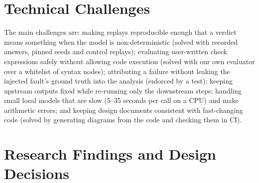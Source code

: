 \section{Technical Challenges}

The main challenges are: making replays reproducible enough that a verdict means something when the model is non-deterministic (solved with recorded answers, pinned seeds and control replays); evaluating user-written check expressions safely without allowing code execution (solved with our own evaluator over a whitelist of syntax nodes); attributing a failure without leaking the injected fault's ground truth into the analysis (enforced by a test); keeping upstream outputs fixed while re-running only the downstream steps; handling small local models that are slow (5--35 seconds per call on a CPU) and make arithmetic errors; and keeping design documents consistent with fast-changing code (solved by generating diagrams from the code and checking them in CI).

\section{Research Findings and Design Decisions}

